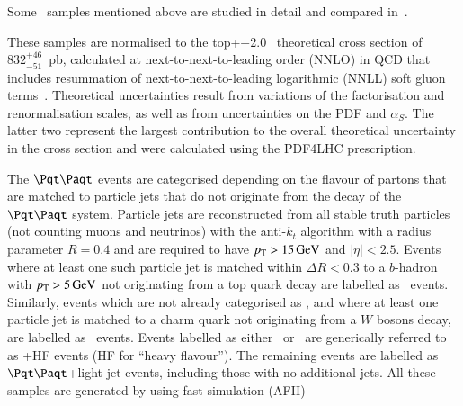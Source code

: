 \begin{description}
Some \ttbar\ samples mentioned above are studied in detail and compared in~\cite{ATL-PHYS-PUB-2022-026}.

These samples are normalised to the top++2.0~\cite{Czakon:2011xx} theoretical cross
section of $832^{+46}_{-51}$~pb, calculated at next-to-next-to-leading order
(NNLO) in QCD that includes resummation of next-to-next-to-leading logarithmic
(NNLL) soft gluon terms~\cite{Cacciari:2011hy,Baernreuther:2012ws,Czakon:2012zr,Czakon:2012pz,Czakon:2013goa}.
Theoretical uncertainties result from variations of the factorisation and
renormalisation scales, as well as from uncertainties on the PDF and
$\alpha_{S}$. The latter two represent the largest contribution to the overall
theoretical uncertainty in the cross section and were calculated using the
PDF4LHC prescription.

The $\ttbar$ events are categorised
depending on the flavour of partons that are matched to particle jets that do
not originate from the decay of the $\ttbar$ system. Particle jets are
reconstructed from all stable truth particles (not counting muons and neutrinos)
with the anti-$k_t$ algorithm with a radius parameter $R=0.4$ and are required
to have $p_{\text{T}}>15\,\text{GeV}$ and $|\eta|<2.5$. Events where at least one such particle
jet is matched within $\Delta R<0.3$ to a $b$-hadron with $p_{\text{T}}>5\,\text{GeV}$ not
originating from a top quark decay are labelled as \ttbin\ events. Similarly,
events which are not already categorised as \ttbin, and where at least one
particle jet is matched to a charm quark not originating from a $W$ bosons decay,
are labelled as \ttcin\ events.
Events labelled as either \ttbin\  or \ttcin\ are generically referred to as
\ttbar+HF events (HF for ``heavy flavour'').  The remaining events are labelled
as $\ttbar$+light-jet events, including those with no additional jets. All these samples
are generated by using fast simulation (AFII)


\end{description}
